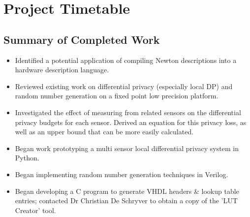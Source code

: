 \documentclass[pageno]{jpaper}
\begin{document}
\section{Project Timetable}
\subsection{Summary of Completed Work}
\begin{itemize}
  \item Identified a potential application of compiling Newton descriptions into a hardware description language.
  \item Reviewed existing work on differential privacy (especially local DP) and random number generation on a fixed point low precision platform.
  \item Investigated the effect of measuring from related sensors on the differential privacy budgets for each sensor. Derived an equation for this privacy loss, as well as an upper bound that can be more easily calculated.
  \item Began work prototyping a multi sensor local differential privacy system in Python.
  \item Began implementing random number generation techniques in Verilog.
  \item Began developing a C program to generate VHDL headers \& lookup table entries; contacted Dr Christian De Schryver to obtain a copy of the 'LUT Creator' tool\cite{DeSchryver}.
\end{itemize}
\end{document}
